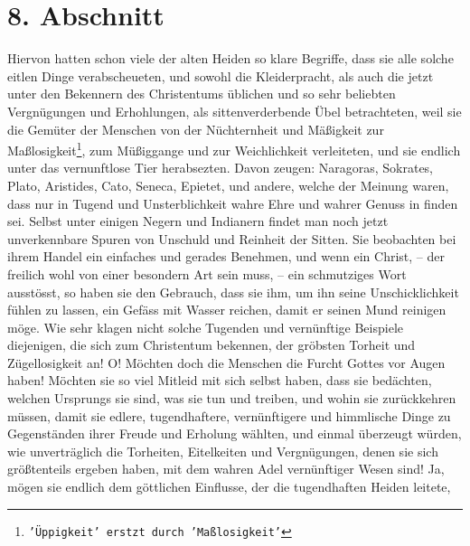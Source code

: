 \section{8. Abschnitt} \label{kap14_ab8}

Hiervon hatten schon viele der alten Heiden so klare Begriffe, dass sie alle
solche eitlen Dinge verabscheueten, und sowohl die Kleiderpracht, als auch die
jetzt unter den Bekennern des Christentums üblichen und so sehr beliebten
Vergnügungen und Erhohlungen, als sittenverderbende Übel betrachteten, weil sie
die Gemüter der Menschen von der Nüchternheit und Mäßigkeit zur Maßlosigkeit\footnote{\texttt{'Üppigkeit' 
erstzt durch 'Maßlosigkeit'}}, zum
Müßiggange und zur Weichlichkeit verleiteten, und sie endlich 
unter das
vernunftlose Tier herabsezten. Davon zeugen: 
Naragoras, Sokrates, Plato,
Aristides, Cato, Seneca, 
Epietet, und andere, welche der Meinung waren, dass nur in
Tugend und Unsterblichkeit wahre Ehre und wahrer Genuss in 
finden sei. Selbst
unter einigen Negern
 und Indianern findet man noch jetzt unverkennbare 
Spuren
von Unschuld und Reinheit der Sitten. Sie beobachten bei ihrem Handel ein
einfaches und gerades Benehmen, und wenn ein Christ, -- der freilich wohl von
einer besondern Art sein muss, -- ein schmutziges Wort ausstösst, so haben sie den
Gebrauch, dass sie ihm, um ihn seine Unschicklichkeit fühlen zu lassen, ein
Gefäss mit Wasser reichen, damit er seinen Mund reinigen möge. Wie sehr klagen
nicht solche Tugenden und vernünftige Beispiele diejenigen, die sich zum
Christentum bekennen, der gröbsten Torheit und Zügellosigkeit an! O! Möchten
doch die Menschen die Furcht Gottes vor Augen haben! Möchten sie so viel Mitleid
mit sich selbst haben, dass sie bedächten, welchen Ursprungs sie sind, was sie
tun und treiben, und wohin sie zurückkehren müssen, damit sie edlere,
tugendhaftere, vernünftigere und himmlische Dinge zu Gegenständen ihrer Freude
und Erholung wählten, und einmal überzeugt würden, wie unverträglich die
Torheiten, Eitelkeiten und Vergnügungen, denen sie sich größtenteils ergeben
haben, mit dem wahren Adel vernünftiger Wesen sind! Ja, mögen sie endlich dem
göttlichen Einflusse, der die tugendhaften Heiden leitete, 
